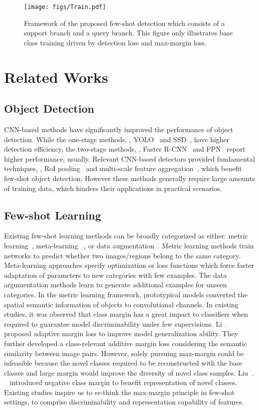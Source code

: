 \documentclass[final]{cvpr}
\begin{document}
\begin{figure*}[t]
\centering
\texttt{[image: figs/Train.pdf]}
\caption{Framework of the proposed few-shot detection which consists of a support branch and a query branch. This figure only illustrates base class training driven by detection loss and max-margin loss.}
\label{fig:flowchart}
\end{figure*}

\section{Related Works}
\subsection{Object Detection}
CNN-based methods have significantly improved the performance of object detection. While the one-stage methods, , YOLO~\cite{YOLO,YOLOV2} and SSD~\cite{SSD}, have higher detection efficiency, the two-stage methods, , Faster R-CNN~\cite{FRCNN,FasterRCNN} and FPN~\cite{FPN} report higher performance, usually. Relevant CNN-based detectors provided fundamental techniques, , RoI pooling~\cite{FRCNN} and multi-scale feature aggregation~\cite{FPN}, which benefit few-shot object detection. However these methods generally require large amounts of training data, which hinders their applications in practical scenarios.

\subsection{Few-shot Learning}
Existing few-shot learning methods can be broadly categorized as either: metric learning~\cite{MatchNetwork16,Compare2018,CollectSelect19,DeepEMD,PMMs,Liu_2021_CVPR,Harmonic,AMN}, meta-learning ~\cite{LearningToLearn16,Optimization17,MAML17,TaskAgnosticMeta19}, or data augmentation~\cite{Hallucinating17,Imaginary18}.
Metric learning methods train networks to predict whether two images/regions belong to the same category. Meta-learning approaches specify optimization or loss functions which force faster adaptation of parameters to new categories with few examples. The data argumentation methods learn to generate additional examples for unseen categories. In the metric learning framework, prototypical models converted the spatial semantic information of objects to convolutional channels. 
In existing studies, it was observed that class margin has a great impact to classifiers when required to guarantee model discriminability under few supervisions. Li~\etal.~\cite{AdaptiveMargin} proposed adaptive margin loss to improve model generalization ability. They further developed a class-relevant additive margin loss considering the semantic similarity between image pairs.
However, solely pursuing max-margin could be infeasible because the novel classes required to be reconstructed with the base classes and large margin would improve the diversity of novel class samples.
Liu~\etal. ~\cite{NegativeMargin} introduced negative class margin to benefit representation of novel classes. Existing studies inspire us to re-think the max-margin principle in few-shot settings, to comprise discriminability and representation capability of features.
\end{document}
